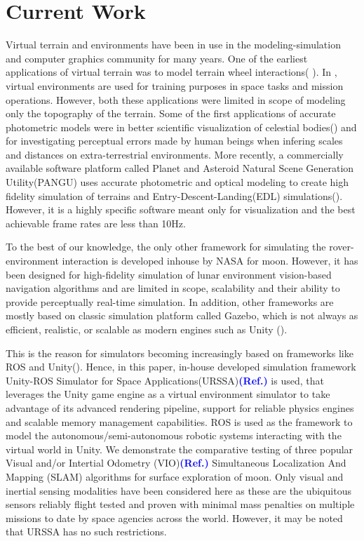 \documentclass[a4paper, 10pt, conference]{ieeeconf}      %
\newcommand\coltxt[2]{\textbf{\textcolor{#1}{(#2)}}}
\newcommand\msm[1]{\coltxt{blue}{#1}}
\begin{document}
\section{Current Work}
Virtual terrain and environments have been in use in the modeling-simulation and computer graphics community for many years. One of the earliest applications of virtual terrain was to model terrain wheel interactions( \cite{yang2007realistic,yang2008virtual,ding2008design,gao2012virtual}). In \cite{andreev2018creating}, virtual environments are used for training purposes in space tasks and mission operations. However, both these applications were limited in scope of modeling only the topography of the terrain. Some of the first applications of accurate photometric models were in better scientific visualization of celestial bodies(\cite{van2011investigation,wright2011preparing, jensen2001physically}) and for investigating perceptual errors made by human beings  when infering scales and distances on extra-terrestrial environments\cite{oravetz2011slope}. More recently, a commercially available software platform called Planet and Asteroid Natural Scene Generation Utility(PANGU) uses accurate photometric and optical modeling  to create high fidelity simulation of terrains and Entry-Descent-Landing(EDL) simulations(\cite{dunstan2018pangu,martin2019planetary}). However, it is a highly specific software meant only for visualization and the best achievable frame rates are less than 10Hz. 

To the best of our knowledge, the only other framework for simulating the rover-environment interaction is developed inhouse by NASA\cite{allan2019planetary} for moon. However, it has been designed for high-fidelity simulation of lunar environment vision-based navigation algorithms and are limited in scope, scalability and their ability to provide perceptually real-time simulation. In addition, other frameworks are mostly based on classic simulation platform called Gazebo\cite{koenig2004design}, which is not always as efficient, realistic, or scalable as modern engines such as Unity (\cite{engine2008unity, konrad2019simulation}). 

This is the reason for simulators becoming increasingly based on frameworks like ROS\cite{quigley2009ros} and Unity(\cite{babaians2018ros2unity3d,bischoffm_2019_06}). Hence, in this paper, in-house developed simulation framework Unity-ROS Simulator for Space Applications(URSSA)\msm{Ref.} is used, that leverages the Unity game engine as a virtual environment simulator to take advantage of its advanced rendering pipeline, support for reliable physics engines and scalable memory management capabilities. ROS is used as the framework to model the autonomous/semi-autonomous robotic systems interacting with the virtual world in Unity. We demonstrate the comparative testing of three popular Visual and/or Intertial Odometry (VIO)\msm{Ref.} Simultaneous Localization And Mapping (SLAM) algorithms for surface exploration of moon. Only visual and inertial sensing modalities have been considered here as these are the ubiquitous sensors reliably flight tested and proven with minimal mass penalties on multiple missions to date by space agencies across the world. However, it may be noted that URSSA has no such restrictions.
\end{document}

